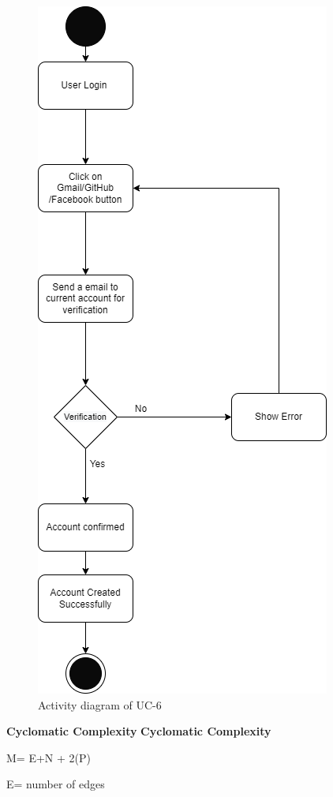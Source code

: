 \begin{figure}[H]
    \centering
    \includegraphics[scale=0.6]{./diagrams/Activity Diagram/ad-06.png}
    \caption{Activity diagram of UC-6}
    \label{fig:act-06}

\end{figure}


\textbf{Cyclomatic Complexity}
\textbf{Cyclomatic Complexity}

M= E+N + 2(P)

E= number of edges

